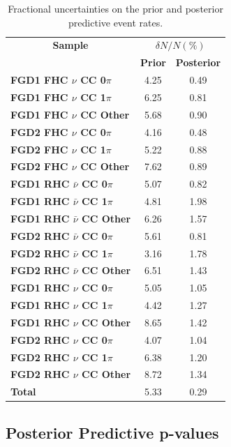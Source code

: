 \begin{center}
\begin{table}
\center
\begin{tabular}{l||c c}
\hline \hline
\multicolumn{1}{c||}{\textbf{Sample}} & \multicolumn{2}{c}{$\delta N/N(\%)$}\\
& \multicolumn{1}{c}{\textbf{Prior}} & \multicolumn{1}{c}{\textbf{Posterior}} \\
\hline\hline
\textbf{FGD1 FHC $\nu$ CC 0$\pi$} & 4.25 & 0.49\\
\textbf{FGD1 FHC $\nu$ CC 1$\pi$} & 6.25 & 0.81\\ 
\textbf{FGD1 FHC $\nu$ CC Other} & 5.68 & 0.90\\ \hline
\textbf{FGD2 FHC $\nu$ CC 0$\pi$} & 4.16 & 0.48\\
\textbf{FGD2 FHC $\nu$ CC 1$\pi$} & 5.22 & 0.88\\
\textbf{FGD2 FHC $\nu$ CC Other} & 7.62 & 0.89\\ \hline
\textbf{FGD1 RHC $\bar{\nu}$ CC 0$\pi$} & 5.07 & 0.82\\
\textbf{FGD1 RHC $\bar{\nu}$ CC 1$\pi$} & 4.81 & 1.98\\
\textbf{FGD1 RHC $\bar{\nu}$ CC Other} & 6.26 & 1.57\\ \hline
\textbf{FGD2 RHC $\bar{\nu}$ CC 0$\pi$} & 5.61 & 0.81\\
\textbf{FGD2 RHC $\bar{\nu}$ CC 1$\pi$} & 3.16 & 1.78\\
\textbf{FGD2 RHC $\bar{\nu}$ CC Other} & 6.51 & 1.43\\ \hline
\textbf{FGD1 RHC $\nu$ CC 0$\pi$} & 5.05 & 1.05\\
\textbf{FGD1 RHC $\nu$ CC 1$\pi$} & 4.42 & 1.27\\
\textbf{FGD1 RHC $\nu$ CC Other} & 8.65 & 1.42\\ \hline
\textbf{FGD2 RHC $\nu$ CC 0$\pi$} & 4.07 & 1.04\\
\textbf{FGD2 RHC $\nu$ CC 1$\pi$} & 6.38 & 1.20\\ 
\textbf{FGD2 RHC $\nu$ CC Other} & 8.72 & 1.34\\ \hline
\textbf{Total} & 5.33 & 0.29 \\ \hline\hline
\end{tabular}
\caption{Fractional uncertainties on the prior and posterior predictive event rates.}
\label{tab:prederr}
\end{table}
\end{center}

\subsection{Posterior Predictive p-values}

